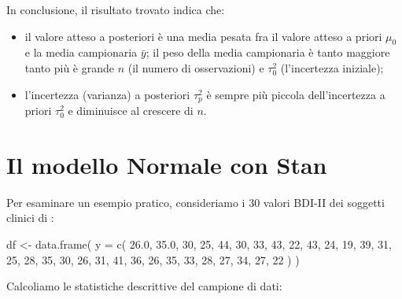 \documentclass[
  11pt,
]{krantz}
\makeatletter
\newenvironment{Shaded}{\begin{snugshade}}{\end{snugshade}}
\newcommand{\AttributeTok}[1]{\textcolor[rgb]{0.61,0.61,0.61}{#1}}
\newcommand{\DecValTok}[1]{\textcolor[rgb]{0.06,0.06,0.06}{#1}}
\newcommand{\FloatTok}[1]{\textcolor[rgb]{0.06,0.06,0.06}{#1}}
\newcommand{\FunctionTok}[1]{\textcolor[rgb]{0,0,0}{#1}}
\newcommand{\NormalTok}[1]{#1}
\newcommand{\OtherTok}[1]{\textcolor[rgb]{0.37,0.37,0.37}{#1}}
\providecommand{\tightlist}{%
  \setlength{\itemsep}{0pt}\setlength{\parskip}{0pt}}
\newenvironment{kframe}{%
\medskip{}
\setlength{\fboxsep}{.8em}
 \def\at@end@of@kframe{}%
 \ifinner\ifhmode%
  \def\at@end@of@kframe{\end{minipage}}%
  \begin{minipage}{\columnwidth}%
 \fi\fi%
 \def\FrameCommand##1{\hskip\@totalleftmargin \hskip-\fboxsep
 \colorbox{shadecolor}{##1}\hskip-\fboxsep
     \hskip-\linewidth \hskip-\@totalleftmargin \hskip\columnwidth}%
 \MakeFramed {\advance\hsize-\width
   \@totalleftmargin\z@ \linewidth\hsize
   \@setminipage}}%
 {\par\unskip\endMakeFramed%
 \at@end@of@kframe}
\renewenvironment{Shaded}{\begin{kframe}}{\end{kframe}}
\theoremstyle{definition}
\theoremstyle{definition}
\theoremstyle{definition}
\theoremstyle{definition}
\theoremstyle{remark}
\makeatother
\begin{document}
In conclusione, il risultato trovato indica che:

\begin{itemize}
\tightlist
\item
  il valore atteso a posteriori è una media pesata fra il valore atteso a priori \(\mu_0\) e la media campionaria \(\bar{y}\); il peso della media campionaria è tanto maggiore tanto più è grande \(n\) (il numero di osservazioni) e \(\tau_0^2\) (l'incertezza iniziale);
\item
  l'incertezza (varianza) a posteriori \(\tau_p^2\) è sempre più piccola dell'incertezza a priori \(\tau_0^2\) e diminuisce al crescere di \(n\).
\end{itemize}

\hypertarget{il-modello-normale-con-stan}{%
\section{Il modello Normale con Stan}\label{il-modello-normale-con-stan}}

Per esaminare un esempio pratico, consideriamo i 30 valori BDI-II dei soggetti clinici di \citet{zetschefuture2019}:

\begin{Shaded}
\begin{Highlighting}[]
\NormalTok{df }\OtherTok{\textless{}{-}} \FunctionTok{data.frame}\NormalTok{(}
  \AttributeTok{y =} \FunctionTok{c}\NormalTok{(}
    \FloatTok{26.0}\NormalTok{, }\FloatTok{35.0}\NormalTok{, }\DecValTok{30}\NormalTok{, }\DecValTok{25}\NormalTok{, }\DecValTok{44}\NormalTok{, }\DecValTok{30}\NormalTok{, }\DecValTok{33}\NormalTok{, }\DecValTok{43}\NormalTok{, }\DecValTok{22}\NormalTok{, }\DecValTok{43}\NormalTok{,}
    \DecValTok{24}\NormalTok{, }\DecValTok{19}\NormalTok{, }\DecValTok{39}\NormalTok{, }\DecValTok{31}\NormalTok{, }\DecValTok{25}\NormalTok{, }\DecValTok{28}\NormalTok{, }\DecValTok{35}\NormalTok{, }\DecValTok{30}\NormalTok{, }\DecValTok{26}\NormalTok{, }\DecValTok{31}\NormalTok{, }\DecValTok{41}\NormalTok{,}
    \DecValTok{36}\NormalTok{, }\DecValTok{26}\NormalTok{, }\DecValTok{35}\NormalTok{, }\DecValTok{33}\NormalTok{, }\DecValTok{28}\NormalTok{, }\DecValTok{27}\NormalTok{, }\DecValTok{34}\NormalTok{, }\DecValTok{27}\NormalTok{, }\DecValTok{22}
\NormalTok{  )}
\NormalTok{)}
\end{Highlighting}
\end{Shaded}

Calcoliamo le statistiche descrittive del campione di dati:
\end{document}
